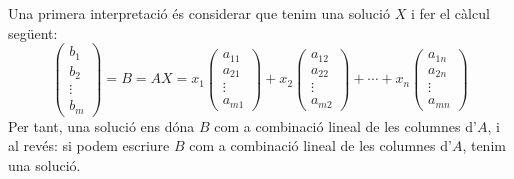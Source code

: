 Una primera interpretació és considerar que tenim una solució $X$ i fer el càlcul següent:
\[
\begin{pmatrix}
b_1 \\ b_2 \\ \vdots \\ b_m
\end{pmatrix} = B = AX =
x_1 \begin{pmatrix}
a_{11} \\ a_{21} \\ \vdots \\ a_{m1}
\end{pmatrix} +
x_2 \begin{pmatrix}
a_{12} \\ a_{22} \\ \vdots \\ a_{m2}
\end{pmatrix} + \cdots +
x_n \begin{pmatrix}
a_{1n} \\ a_{2n} \\ \vdots \\ a_{mn}
\end{pmatrix}
\]
Per tant, una solució ens dóna $B$ com a combinació lineal de les columnes d'$A$, i al revés: si podem escriure $B$ com a combinació lineal de les columnes d'$A$, tenim una solució.

